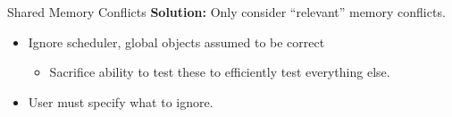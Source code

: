 \documentclass[xcolor=dvipsnames]{beamer}
\begin{document}
\begin{frame}{Shared Memory Conflicts}
	\textbf{Solution:} Only consider ``relevant'' memory conflicts.
	\begin{itemize}
		\item Ignore scheduler, global objects assumed to be correct
		\begin{itemize}
			\item Sacrifice ability to test these to efficiently test everything else.
		\end{itemize}
		\item User must specify what to ignore.
	\end{itemize}
\end{frame}
\end{document}
